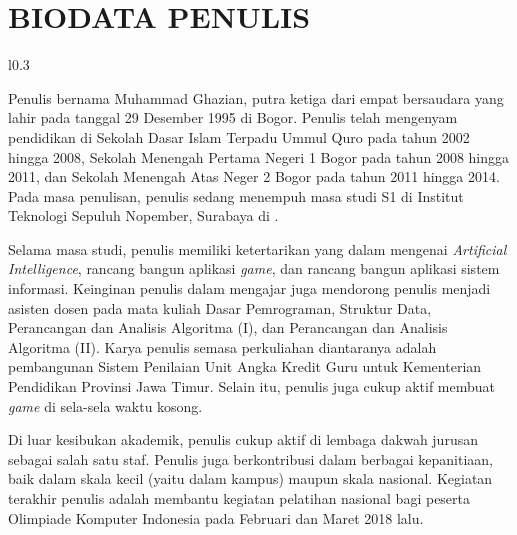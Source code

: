 \chapter{BIODATA PENULIS}

\begin{wrapfigure}{l}{0.3\textwidth}
\end{wrapfigure}

Penulis bernama Muhammad Ghazian, putra ketiga dari empat bersaudara yang lahir pada tanggal 29 Desember 1995 di Bogor. Penulis telah mengenyam pendidikan di Sekolah Dasar Islam Terpadu Ummul Quro pada tahun 2002 hingga 2008, Sekolah Menengah Pertama Negeri 1 Bogor pada tahun 2008 hingga 2011, dan Sekolah Menengah Atas Neger 2 Bogor pada tahun 2011 hingga 2014. Pada masa penulisan, penulis sedang menempuh masa studi S1 di Institut Teknologi Sepuluh Nopember, Surabaya di \jurusanbaru.

Selama masa studi, penulis memiliki ketertarikan yang dalam mengenai \textit{Artificial Intelligence}, rancang bangun aplikasi \textit{game}, dan rancang bangun aplikasi sistem informasi. Keinginan penulis dalam mengajar juga mendorong penulis menjadi asisten dosen pada mata kuliah Dasar Pemrograman, Struktur Data, Perancangan dan Analisis Algoritma (I), dan Perancangan dan Analisis Algoritma (II). Karya penulis semasa perkuliahan diantaranya adalah pembangunan Sistem Penilaian Unit Angka Kredit Guru untuk Kementerian Pendidikan Provinsi Jawa Timur. Selain itu, penulis juga cukup aktif membuat \textit{game} di sela-sela waktu kosong.

Di luar kesibukan akademik, penulis cukup aktif di lembaga dakwah jurusan sebagai salah satu staf. Penulis juga berkontribusi dalam berbagai kepanitiaan, baik dalam skala kecil (yaitu dalam kampus) maupun skala nasional. Kegiatan terakhir penulis adalah membantu kegiatan pelatihan nasional bagi peserta Olimpiade Komputer Indonesia pada Februari dan Maret 2018 lalu.

